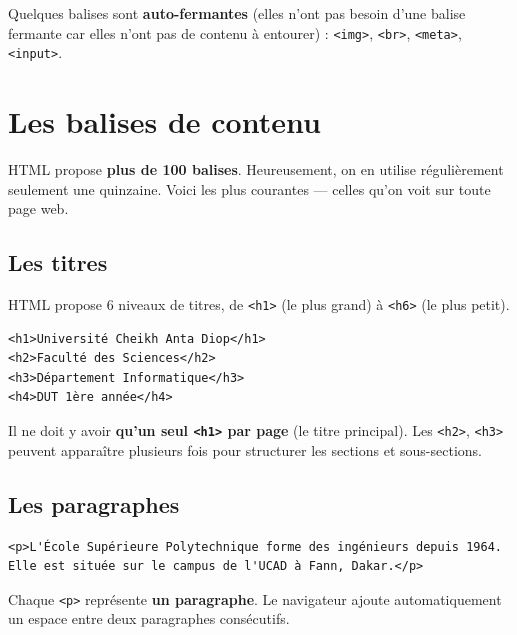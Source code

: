 \documentclass[11pt,a4paper]{article}
\begin{document}
Quelques balises sont \textbf{auto-fermantes} (elles n'ont pas besoin d'une
balise fermante car elles n'ont pas de contenu à entourer) :
\texttt{<img>}, \texttt{<br>}, \texttt{<meta>}, \texttt{<input>}.

\newpage

\section{Les balises de contenu}

HTML propose \textbf{plus de 100 balises}. Heureusement, on en utilise
régulièrement seulement une quinzaine. Voici les plus courantes --- celles
qu'on voit sur toute page web.

\subsection{Les titres}

HTML propose 6 niveaux de titres, de \texttt{<h1>} (le plus grand) à
\texttt{<h6>} (le plus petit).

\begin{lstlisting}[language=HTML5]
<h1>Université Cheikh Anta Diop</h1>
<h2>Faculté des Sciences</h2>
<h3>Département Informatique</h3>
<h4>DUT 1ère année</h4>
\end{lstlisting}

\begin{attentionbox}
Il ne doit y avoir \textbf{qu'un seul \texttt{<h1>} par page} (le titre
principal). Les \texttt{<h2>}, \texttt{<h3>} peuvent apparaître plusieurs
fois pour structurer les sections et sous-sections.
\end{attentionbox}

\subsection{Les paragraphes}

\begin{lstlisting}[language=HTML5]
<p>L'École Supérieure Polytechnique forme des ingénieurs depuis 1964. Elle est située sur le campus de l'UCAD à Fann, Dakar.</p>
\end{lstlisting}

Chaque \texttt{<p>} représente \textbf{un paragraphe}. Le navigateur ajoute
automatiquement un espace entre deux paragraphes consécutifs.
\end{document}
